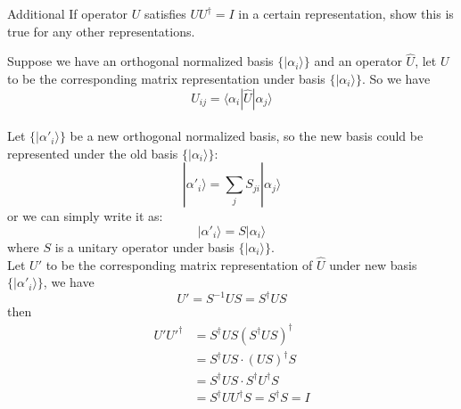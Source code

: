 \documentclass[UTF8,12pt]{article} %
\makeatletter
\newenvironment{proof}[1][\protect\proofname]{\par
\normalfont\topsep6\p@\@plus6\p@\relax
\trivlist
\itemindent\parindent
\item[\hskip\labelsep
\scshape
#1]\ignorespaces
}{%
\endtrivlist\@endpefalse
}
\renewcommand{\proofname}{\it{Solution}}
\makeatother
\begin{document}
\begin{exercise}{Additional}{}
If operator $U$ satisfies $UU^\dagger = I$ in a certain representation, show this is true for any other representations.
\end{exercise}

\begin{proof}[Proof]
Suppose we have an orthogonal normalized basis $\{|\alpha_i\rangle\}$ and an operator $\hat{U}$, let $U$ to be the corresponding matrix representation under basis $\{|\alpha_i\rangle\}$. So we have
$$U_{ij} = \langle\alpha_i|\hat{U}|\alpha_j\rangle$$\\
Let $\{|\alpha'_i\rangle\}$ be a new orthogonal normalized basis, so the new basis could be represented under the old basis $\{|\alpha_i\rangle\}$:
$$|\alpha'_i\rangle = \sum_j S_{ji}|\alpha_j\rangle$$
or we can simply write it as:
$$|\alpha'_i\rangle = S|\alpha_i\rangle$$
where $S$ is a unitary operator under basis $\{|\alpha_i\rangle\}$.\\
Let $U'$ to be the corresponding matrix representation of $\hat{U}$ under new basis $\{|\alpha'_i\rangle\}$, we have
$$U' = S^{-1}US = S^\dagger US$$
then
\begin{align*}
U'U'^\dagger &= S^\dagger US(S^\dagger US)^\dagger \\
&= S^\dagger US\cdot (US)^\dagger S \\
&= S^\dagger US\cdot S^\dagger U^\dagger S \\
&= S^\dagger UU^\dagger S = S^\dagger S = I
\end{align*}
\end{proof}
\end{document}
